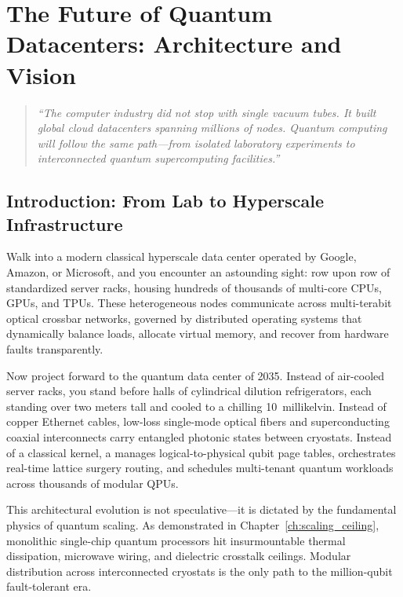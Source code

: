 \chapter{The Future of Quantum Datacenters: Architecture and Vision}
\label{ch:future_quantum_datacenters}

\begin{quote}
\textit{``The computer industry did not stop with single vacuum tubes. It built global cloud datacenters spanning millions of nodes. Quantum computing will follow the same path---from isolated laboratory experiments to interconnected quantum supercomputing facilities.''}
\end{quote}


\section{Introduction: From Lab to Hyperscale Infrastructure}

Walk into a modern classical hyperscale data center operated by Google, Amazon, or Microsoft, and you encounter an astounding sight: row upon row of standardized server racks, housing hundreds of thousands of multi-core CPUs, GPUs, and TPUs. These heterogeneous nodes communicate across multi-terabit optical crossbar networks, governed by distributed operating systems that dynamically balance loads, allocate virtual memory, and recover from hardware faults transparently.

Now project forward to the quantum data center of 2035. Instead of air-cooled server racks, you stand before halls of cylindrical dilution refrigerators, each standing over two meters tall and cooled to a chilling 10~millikelvin. Instead of copper Ethernet cables, low-loss single-mode optical fibers and superconducting coaxial interconnects carry entangled photonic states between cryostats. Instead of a classical kernel, a  manages logical-to-physical qubit page tables, orchestrates real-time lattice surgery routing, and schedules multi-tenant quantum workloads across thousands of modular QPUs.

This architectural evolution is not speculative---it is dictated by the fundamental physics of quantum scaling. As demonstrated in Chapter~\ref{ch:scaling_ceiling}, monolithic single-chip quantum processors hit insurmountable thermal dissipation, microwave wiring, and dielectric crosstalk ceilings. Modular distribution across interconnected cryostats is the only path to the million-qubit fault-tolerant era.

